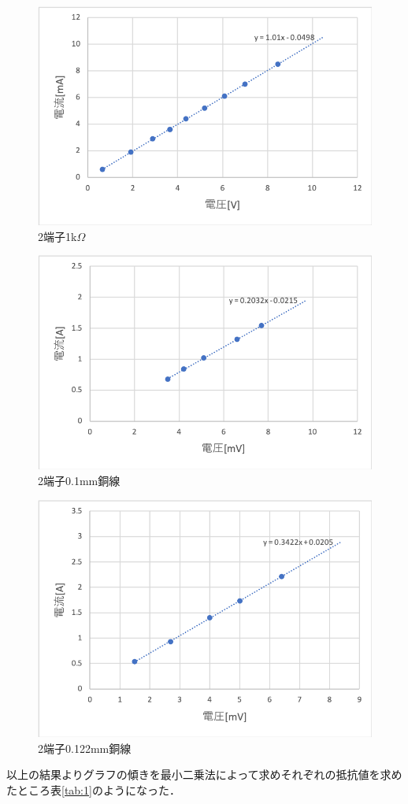 \documentclass[11pt, a4paper,twocolumn]{jarticle}
\begin{document}
\begin{figure}[htbp]
 \begin{center}
  \includegraphics[width=0.8\linewidth]{fig10.png}
 \end{center}
 \caption{2端子1k$\Omega$}
 \label{fig:10}
\end{figure}

\begin{figure}[htbp]
 \begin{center}
  \includegraphics[width=0.8\linewidth]{fig11.png}
 \end{center}
 \caption{2端子0.1mm銅線}
 \label{fig:11}
\end{figure}

\begin{figure}[htbp]
 \begin{center}
  \includegraphics[width=0.8\linewidth]{fig12.png}
 \end{center}
 \caption{2端子0.122mm銅線}
 \label{fig:12}
\end{figure}
\newpage
以上の結果よりグラフの傾きを最小二乗法によって求めそれぞれの抵抗値を求めたところ表\ref{tab:1}のようになった．
\end{document}
